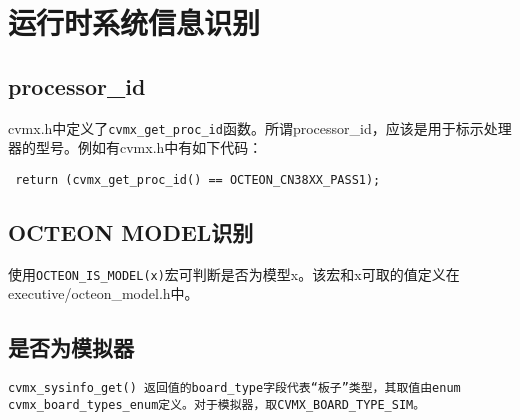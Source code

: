 \section{运行时系统信息识别}

\subsection{processor\_id}
cvmx.h中定义了\verb+cvmx_get_proc_id+函数。所谓processor\_id，应该是用于标示处理器的型号。例如有cvmx.h中有如下代码：
\begin{verbatim}
 return (cvmx_get_proc_id() == OCTEON_CN38XX_PASS1);
\end{verbatim}


\subsection{OCTEON MODEL识别}
使用\verb|OCTEON_IS_MODEL(x)|宏可判断是否为模型x。该宏和x可取的值定义在executive/octeon\_model.h中。

\subsection{是否为模拟器}
\begin{verbatim}
cvmx_sysinfo_get() 返回值的board_type字段代表“板子”类型，其取值由enum cvmx_board_types_enum定义。对于模拟器，取CVMX_BOARD_TYPE_SIM。
\end{verbatim}


